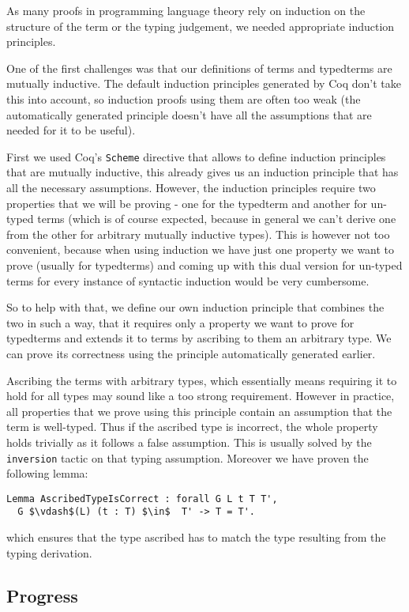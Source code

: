 \documentclass[runningheads]{article}
\begin{document}
As many proofs in programming language theory rely on induction on the structure of the term or the typing judgement, we needed appropriate induction principles.

One of the first challenges was that our definitions of terms and typedterms are mutually inductive. The default induction principles generated by Coq don't take this into account, so induction proofs using them are often too weak (the automatically generated principle doesn't have all the assumptions that are needed for it to be useful).

First we used Coq's \verb|Scheme| directive that allows to define induction principles that are mutually inductive, this already gives us an induction principle that has all the necessary assumptions. However, the induction principles require two properties that we will be proving - one for the typedterm and another for un-typed terms (which is of course expected, because in general we can't derive one from the other for arbitrary mutually inductive types). This is however not too convenient, because when using induction we have just one property we want to prove (usually for typedterms) and coming up with this dual version for un-typed terms for every instance of syntactic induction would be very cumbersome.

So to help with that, we define our own induction principle that combines the two in such a way, that it requires only a property we want to prove for typedterms and extends it to terms by ascribing to them an arbitrary type. We can prove its correctness using the principle automatically generated earlier.

Ascribing the terms with arbitrary types, which essentially means requiring it to hold for all types may sound like a too strong requirement. However in practice, all properties that we prove using this principle contain an assumption that the term is well-typed. Thus if the ascribed type is incorrect, the whole property holds trivially as it follows a false assumption. This is usually solved by the \verb|inversion| tactic on that typing assumption. Moreover we have proven the following lemma:
\begin{lstlisting}[mathescape=true]
Lemma AscribedTypeIsCorrect : forall G L t T T',
  G $\vdash$(L) (t : T) $\in$  T' -> T = T'.
\end{lstlisting}
which ensures that the type ascribed has to match the type resulting from the typing derivation.

\subsection{Progress}
\end{document}
